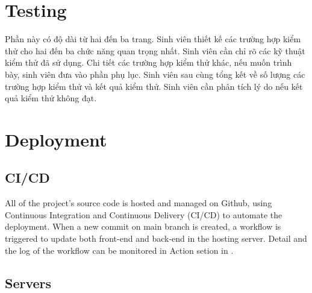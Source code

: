 \documentclass[../Main.tex]{subfiles}
\begin{document}
\section{Testing}
Phần này có độ dài từ hai đến ba trang. Sinh viên thiết kế các trường hợp kiểm thử cho hai đến ba chức năng quan trọng nhất. Sinh viên cần chỉ rõ các kỹ thuật kiểm thử đã sử dụng. Chi tiết các trường hợp kiểm thử khác, nếu muốn trình bày, sinh viên đưa vào phần phụ lục.
Sinh viên sau cùng tổng kết về số lượng các trường hợp kiểm thử và kết quả kiểm thử. Sinh viên cần phân tích lý do nếu kết quả kiểm thử không đạt.

\section{Deployment}
\subsection{CI/CD}
 All of the project's source code is hosted and managed on Github, using Continuous Integration and Continuous Delivery (CI/CD) to automate the deployment. When a new commit on main branch is created, a workflow is triggered to update both front-end and back-end in the hosting server. Detail and the log of the workflow can be monitored in Action setion in .

 \subsection{Servers}
\end{document}

